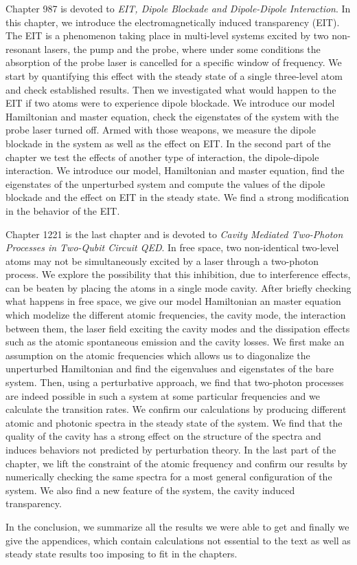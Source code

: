 Chapter 987 is devoted to \textit{EIT, Dipole Blockade and Dipole-Dipole Interaction}. In this chapter, we introduce the electromagnetically induced transparency (EIT). The EIT is a phenomenon taking place in multi-level systems excited by two non-resonant lasers, the pump and the probe, where under some conditions the absorption of the probe laser is cancelled for a specific window of frequency. We start by quantifying this effect with the steady state of a single three-level atom and check established results. Then we investigated what would happen to the EIT if two atoms were to experience dipole blockade. We introduce our model Hamiltonian and master equation, check the eigenstates of the system with the probe laser turned off. Armed with those weapons, we measure the dipole blockade in the system as well as the effect on EIT. In the second part of the chapter we test the effects of another type of interaction, the dipole-dipole interaction. We introduce our model, Hamiltonian and master equation, find the eigenstates of the unperturbed system and compute the values of the dipole blockade and the effect on EIT in the steady state. We find a strong modification in the behavior of the EIT.

Chapter 1221 is the last chapter and is devoted to \textit{Cavity Mediated Two-Photon Processes in Two-Qubit Circuit QED}. In free space, two non-identical two-level atoms may not be simultaneously excited by a laser through a two-photon process. We explore the possibility that this inhibition, due to interference effects, can be beaten by placing the atoms in a single mode cavity. After briefly checking what happens in free space, we give our model Hamiltonian an master equation which modelize the different atomic frequencies, the cavity mode, the interaction between them, the laser field exciting the cavity modes and the dissipation effects such as the atomic spontaneous emission and the cavity losses. We first make an assumption on the atomic frequencies which allows us to diagonalize the unperturbed Hamiltonian and find the eigenvalues and eigenstates of the bare system. Then, using a perturbative approach, we find that  two-photon processes are indeed possible in such a system at some particular frequencies and we calculate the transition rates. We confirm our calculations by producing different atomic and photonic spectra in the steady state of the system. We find that the quality of the cavity has a strong effect on the structure of the spectra and induces behaviors not predicted by perturbation theory. In the last part of the chapter, we lift the constraint of the atomic frequency and confirm our results by numerically checking the same spectra for a most general configuration of the system. We also find a new feature of the system, the cavity induced transparency.

In the conclusion, we summarize all the results we were able to get and finally we give the appendices, which contain calculations not essential to the text as well as steady state results too imposing to fit in the chapters.
